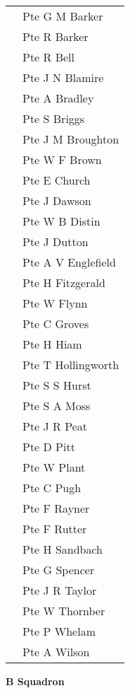 \begin{center}
\begin{tabular}{rl}
    & Pte G M Barker \\
    & Pte R Barker \\
    & Pte R Bell \\
    & Pte J N Blamire \\
    & Pte A Bradley \\
    & Pte S Briggs \\
    & Pte J M Broughton \\
    & Pte W F Brown \\
    & Pte E Church \\
    & Pte J Dawson \\
    & Pte W B Distin \\
    & Pte J Dutton \\
    & Pte A V Englefield \\
    & Pte H Fitzgerald \\
    & Pte W Flynn \\
    & Pte C Groves \\
    & Pte H Hiam \\
    & Pte T Hollingworth \\
    & Pte S S Hurst \\
    & Pte S A Moss \\
    & Pte J R Peat \\
    & Pte D Pitt \\
    & Pte W Plant \\
    & Pte C Pugh \\
    & Pte F Rayner \\
    & Pte F Rutter \\
    & Pte H Sandbach \\
    & Pte G Spencer \\
    & Pte J R Taylor \\
    & Pte W Thornber \\
    & Pte P Whelam \\
    & Pte A Wilson \\
  \end{tabular}
\end{center}

\begin{center}
  \Large
  \textbf{B Squadron}
\end{center}

